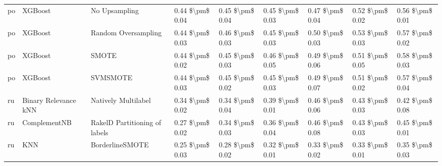 \begin{tabular}{lllllllll}
      po &                         XGBoost &                 No Upsampling & 0.44 \$\textbackslash pm\$ 0.04 &           0.45 \$\textbackslash pm\$ 0.04 &       0.45 \$\textbackslash pm\$ 0.03 &        0.47 \$\textbackslash pm\$ 0.04 &                         0.52 \$\textbackslash pm\$ 0.02 &     0.56 \$\textbackslash pm\$ 0.01 \\
      po &                         XGBoost &           Random Oversampling & 0.44 \$\textbackslash pm\$ 0.03 &           0.46 \$\textbackslash pm\$ 0.03 &       0.45 \$\textbackslash pm\$ 0.03 &        0.50 \$\textbackslash pm\$ 0.03 &                         0.53 \$\textbackslash pm\$ 0.03 &     0.57 \$\textbackslash pm\$ 0.02 \\
      po &                         XGBoost &                         SMOTE & 0.44 \$\textbackslash pm\$ 0.02 &           0.45 \$\textbackslash pm\$ 0.03 &       0.46 \$\textbackslash pm\$ 0.05 &        0.49 \$\textbackslash pm\$ 0.06 &                         0.51 \$\textbackslash pm\$ 0.05 &     0.58 \$\textbackslash pm\$ 0.03 \\
      po &                         XGBoost &                      SVMSMOTE & 0.44 \$\textbackslash pm\$ 0.03 &           0.45 \$\textbackslash pm\$ 0.02 &       0.45 \$\textbackslash pm\$ 0.03 &        0.49 \$\textbackslash pm\$ 0.07 &                         0.51 \$\textbackslash pm\$ 0.02 &     0.57 \$\textbackslash pm\$ 0.04 \\
      ru &            Binary Relevance kNN &           Natively Multilabel & 0.34 \$\textbackslash pm\$ 0.02 &           0.34 \$\textbackslash pm\$ 0.04 &       0.39 \$\textbackslash pm\$ 0.01 &        0.46 \$\textbackslash pm\$ 0.06 &                         0.43 \$\textbackslash pm\$ 0.03 &     0.42 \$\textbackslash pm\$ 0.08 \\
      ru &                    ComplementNB & RakelD Partitioning of labels & 0.27 \$\textbackslash pm\$ 0.02 &           0.34 \$\textbackslash pm\$ 0.03 &       0.36 \$\textbackslash pm\$ 0.04 &        0.46 \$\textbackslash pm\$ 0.08 &                         0.43 \$\textbackslash pm\$ 0.03 &     0.45 \$\textbackslash pm\$ 0.01 \\
      ru &                             KNN &               BorderlineSMOTE & 0.25 \$\textbackslash pm\$ 0.03 &           0.28 \$\textbackslash pm\$ 0.02 &       0.32 \$\textbackslash pm\$ 0.01 &        0.33 \$\textbackslash pm\$ 0.02 &                         0.33 \$\textbackslash pm\$ 0.01 &     0.35 \$\textbackslash pm\$ 0.03 \\

\end{tabular}
